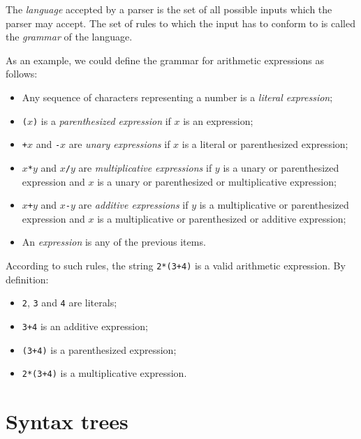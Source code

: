 \documentclass[11pt, american, draft]{PhdThesis}
\begin{document}
  The \emph{language} accepted by a parser is the set of all possible inputs which the parser may
  accept. The set of rules to which the input has to conform to is called the \emph{grammar} of the
  language.

  As an example, we could define the grammar for arithmetic expressions as follows:

  \begin{itemize}[noitemsep,topsep=0pt]
    \item Any sequence of characters representing a number is a \emph{literal expression};

    \item \mbox{\texttt{($x$)}} is a \emph{parenthesized expression} if $x$ is an expression;

    \item \mbox{\texttt{+$x$}} and \mbox{\texttt{-$x$}} are \emph{unary expressions} if $x$ is a
    literal or parenthesized expression;

    \item \mbox{\texttt{$x$*$y$}} and \mbox{\texttt{$x$/$y$}} are \emph{multiplicative expressions}
    if $y$ is a unary or parenthesized expression and $x$ is a unary or parenthesized or
    multiplicative expression;

    \item \mbox{\texttt{$x$+$y$}} and \mbox{\texttt{$x$-$y$}} are \emph{additive expressions}
    if $y$ is a multiplicative or parenthesized expression and $x$ is a multiplicative or
    parenthesized or additive expression;

    \item An \emph{expression} is any of the previous items.
  \end{itemize}

  According to such rules, the string \verb$2*(3+4)$ is a valid arithmetic expression. By
  definition:

  \begin{itemize}[noitemsep,topsep=0pt]
    \item \verb$2$, \verb$3$ and \verb$4$ are literals;
    \item \verb$3+4$ is an additive expression;
    \item \verb$(3+4)$ is a parenthesized expression;
    \item \verb$2*(3+4)$ is a multiplicative expression.
  \end{itemize}

  \section{Syntax trees}
\end{document}
